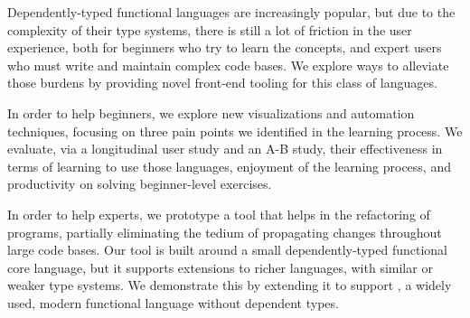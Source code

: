 \documentclass[12pt]{ucsddissertation}
\begin{document}
\begin{dissertationabstract}

Dependently-typed functional languages are increasingly popular, but due to the
complexity of their type systems, there is still a lot of friction in the user
experience, both for beginners who try to learn the concepts, and expert users
who must write and maintain complex code bases.  We explore ways to alleviate
those burdens by providing novel front-end tooling for this class of languages.

In order to help beginners, we explore new visualizations and automation
techniques, focusing on three pain points we identified in the learning process.
We evaluate, via a longitudinal user study and an A-B study, their effectiveness
in terms of learning to use those languages, enjoyment of the learning process,
and productivity on solving beginner-level exercises.

In order to help experts, we prototype a tool that helps in the refactoring of
programs, partially eliminating the tedium of propagating changes throughout
large code bases.  Our tool is built around a small dependently-typed functional
core language, but it supports extensions to richer languages, with similar or
weaker type systems.  We demonstrate this by extending it to support \OCaml{}, a
widely used, modern functional language without dependent types.

\end{dissertationabstract}

\mainmatter

\begin{dissertationintroduction}




\end{dissertationintroduction}







\appendix


\backmatter

\end{document}

